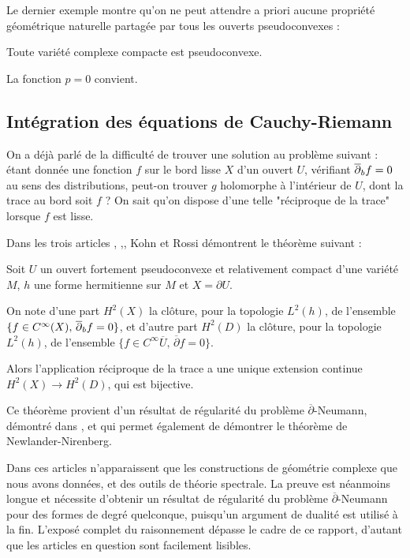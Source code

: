 Le dernier exemple montre qu'on ne peut attendre a priori aucune propriété géométrique naturelle partagée par tous les ouverts pseudoconvexes :
\begin{exemple}
Toute variété complexe compacte est pseudoconvexe.
\end{exemple}
\begin{preuve}
La fonction $p=0$ convient.
\end{preuve}
\subsection{Intégration des équations de Cauchy-Riemann}
On a déjà parlé de la difficulté de trouver une solution au problème suivant : étant donnée une fonction $f$ sur le bord lisse $X$ d'un ouvert $U$, vérifiant $\overline{\partial}_b f =0$ au sens des distributions, peut-on trouver $g$ holomorphe à l'intérieur de $U$, dont la trace au bord soit $f$ ? On sait qu'on dispose d'une telle "réciproque de la trace" lorsque $f$ est lisse.

Dans les trois articles \cite{Kohn}, \cite{Kohn},\cite{Kohn}, Kohn et Rossi démontrent le théorème suivant :
\begin{theorem}[Kohn]\label{thm:annexe}
Soit $U$ un ouvert fortement pseudoconvexe et relativement compact d'une variété $M$, $h$ une forme hermitienne sur $M$ et $X=\partial U$.

On note d'une part $H^2(X)$ la clôture, pour la topologie $L^2(h)$, de l'ensemble $\{f \in C^{\infty}(X),\,\overline{\partial}_b f =0\}$, et d'autre part $H^2(D)$ la clôture, pour la topologie $L^2(h)$, de l'ensemble $\{f \in C^{\infty}{\overline{U}},\,\overline{\partial}f =0\}$.

Alors l'application réciproque de la trace a une unique extension continue $H^2(X)\to H^2(D)$, qui est bijective.
\end{theorem}
Ce théorème provient d'un résultat de régularité du problème $\overline{\partial}$-Neumann, démontré dans \cite{Kohn}, et qui permet également de démontrer le théorème de Newlander-Nirenberg.

Dans ces articles n'apparaissent que les constructions de géométrie complexe que nous avons données, et des outils de théorie spectrale. La preuve est néanmoins longue et nécessite d'obtenir un résultat de régularité du problème $\overline{\partial}$-Neumann pour des formes de degré quelconque, puisqu'un argument de dualité est utilisé à la fin. L'exposé complet du raisonnement dépasse le cadre de ce rapport, d'autant que les articles en question sont facilement lisibles.

